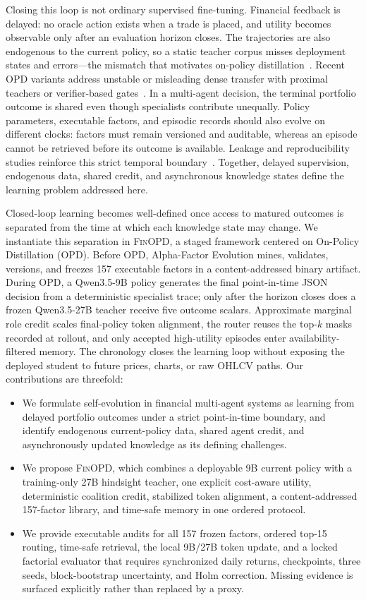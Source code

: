 Closing this loop is not ordinary supervised fine-tuning. Financial feedback is delayed: no oracle action exists when a trade is placed, and utility becomes observable only after an evaluation horizon closes. The trajectories are also endogenous to the current policy, so a static teacher corpus misses deployment states and errors---the mismatch that motivates on-policy distillation~\cite{gkd2024,seed2026}. Recent OPD variants address unstable or misleading dense transfer with proximal teachers or verifier-based gates~\cite{topd2026,rgopd2026}. In a multi-agent decision, the terminal portfolio outcome is shared even though specialists contribute unequally. Policy parameters, executable factors, and episodic records should also evolve on different clocks: factors must remain versioned and auditable, whereas an episode cannot be retrieved before its outcome is available. Leakage and reproducibility studies reinforce this strict temporal boundary~\cite{profitmirage2025,nguyen2026reliable,yao2026execution}. Together, delayed supervision, endogenous data, shared credit, and asynchronous knowledge states define the learning problem addressed here.

Closed-loop learning becomes well-defined once access to matured outcomes is separated from the time at which each knowledge state may change. We instantiate this separation in \textsc{FinOPD}, a staged framework centered on On-Policy Distillation (OPD). Before OPD, Alpha-Factor Evolution mines, validates, versions, and freezes 157 executable factors in a content-addressed binary artifact. During OPD, a Qwen3.5-9B policy generates the final point-in-time JSON decision from a deterministic specialist trace; only after the horizon closes does a frozen Qwen3.5-27B teacher receive five outcome scalars. Approximate marginal role credit scales final-policy token alignment, the router reuses the top-$k$ masks recorded at rollout, and only accepted high-utility episodes enter availability-filtered memory. The chronology closes the learning loop without exposing the deployed student to future prices, charts, or raw OHLCV paths.
Our contributions are threefold:
\begin{itemize}[leftmargin=*,nosep]
\item We formulate self-evolution in financial multi-agent systems as learning from delayed portfolio outcomes under a strict point-in-time boundary, and identify endogenous current-policy data, shared agent credit, and asynchronously updated knowledge as its defining challenges.
\item We propose \textsc{FinOPD}, which combines a deployable 9B current policy with a training-only 27B hindsight teacher, one explicit cost-aware utility, deterministic coalition credit, stabilized token alignment, a content-addressed 157-factor library, and time-safe memory in one ordered protocol.
\item We provide executable audits for all 157 frozen factors, ordered top-15 routing, time-safe retrieval, the local 9B/27B token update, and a locked factorial evaluator that requires synchronized daily returns, checkpoints, three seeds, block-bootstrap uncertainty, and Holm correction. Missing evidence is surfaced explicitly rather than replaced by a proxy.
\end{itemize}
